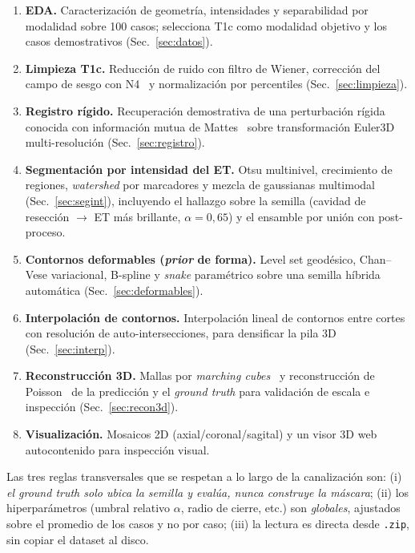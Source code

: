 \documentclass[conference]{IEEEtran}
\begin{document}
\begin{enumerate}
  \item \textbf{EDA.} Caracterización de geometría, intensidades y
        separabilidad por modalidad sobre 100 casos; selecciona
        T1c como modalidad objetivo y los casos demostrativos
        (Sec.~\ref{sec:datos}).
  \item \textbf{Limpieza T1c.} Reducción de ruido con filtro de
        Wiener, corrección del campo de sesgo con
        N4~\cite{tustison2010n4} y normalización por percentiles
        (Sec.~\ref{sec:limpieza}).
  \item \textbf{Registro rígido.} Recuperación demostrativa de
        una perturbación rígida conocida con información mutua de
        Mattes~\cite{mattes2003} sobre transformación Euler3D
        multi-resolución (Sec.~\ref{sec:registro}).
  \item \textbf{Segmentación por intensidad del ET.} Otsu multinivel,
        crecimiento de regiones, \textit{watershed} por
        marcadores y mezcla de gaussianas multimodal
        (Sec.~\ref{sec:segint}), incluyendo el hallazgo sobre la semilla
        (cavidad de resección $\to$ ET más brillante,
        $\alpha=0{,}65$) y el ensamble por unión con post-proceso.
  \item \textbf{Contornos deformables (\emph{prior} de forma).}
        Level set geodésico, Chan--Vese variacional, B-spline y
        \textit{snake} paramétrico sobre una semilla híbrida automática
        (Sec.~\ref{sec:deformables}).
  \item \textbf{Interpolación de contornos.} Interpolación lineal de
        contornos entre cortes con resolución de auto-intersecciones, para
        densificar la pila 3D (Sec.~\ref{sec:interp}).
  \item \textbf{Reconstrucción 3D.} Mallas por \textit{marching
        cubes}~\cite{lorensen1987marching} y reconstrucción de
        Poisson~\cite{kazhdan2013screened} de la predicción y el
        \textit{ground truth} para validación de escala e inspección
        (Sec.~\ref{sec:recon3d}).
  \item \textbf{Visualización.} Mosaicos 2D (axial/coronal/sagital)
        y un visor 3D web autocontenido para inspección visual.
\end{enumerate}

Las tres reglas transversales que se respetan a lo largo de la
canalización son: (i) \emph{el \textit{ground truth} solo ubica la
semilla y evalúa, nunca construye la máscara}; (ii) los
hiperparámetros (umbral relativo $\alpha$, radio de cierre, etc.)
son \emph{globales}, ajustados sobre el promedio de los casos y no
por caso; (iii) la lectura es directa desde \texttt{.zip}, sin
copiar el dataset al disco.
\end{document}
